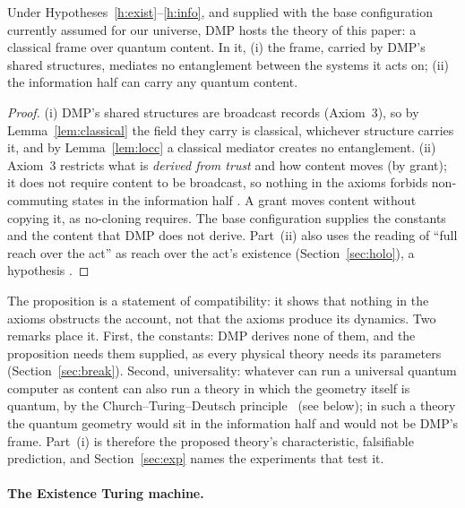\begin{proposition}\label{th:host}
Under Hypotheses~\ref{h:exist}--\ref{h:info}, and supplied with the base configuration currently assumed for our universe, DMP hosts the
theory of this paper: a classical frame over quantum content. In it, (i) the frame, carried by DMP's shared structures, mediates
no entanglement between the systems it acts on; (ii) the information half can carry any quantum content.
\end{proposition}

\begin{proof}
(i) DMP's shared structures are broadcast records (Axiom~3), so by Lemma~\ref{lem:classical} the field they carry is classical, whichever
structure carries it, and by Lemma~\ref{lem:locc} a classical mediator creates no entanglement. (ii) Axiom~3 restricts what is
\emph{derived from trust} and how content moves (by grant); it does not require content to be broadcast, so nothing in the axioms forbids
non-commuting states in the information half \tagD. A grant moves content without copying it, as no-cloning requires. The base
configuration supplies the constants and the content that DMP does not derive. Part~(ii) also uses the reading of ``full reach over
the act'' as reach over the act's existence (Section~\ref{sec:holo}), a hypothesis \tagH.
\end{proof}

The proposition is a statement of compatibility: it shows that nothing in the axioms obstructs the account, not that the axioms produce
its dynamics. Two remarks place it. First, the constants: DMP derives none of them, and the proposition needs them supplied, as every physical
theory needs its parameters (Section~\ref{sec:break}). Second, universality: whatever can run a universal quantum computer as content can
also run a theory in which the geometry itself is quantum, by the Church--Turing--Deutsch principle~\cite{deutsch} (see below);
in such a theory the quantum geometry would sit in the information half and would not be DMP's frame. Part~(i) is therefore the proposed
theory's characteristic, falsifiable prediction, and Section~\ref{sec:exp} names the experiments that test it.

\paragraph{The Existence Turing machine.}

